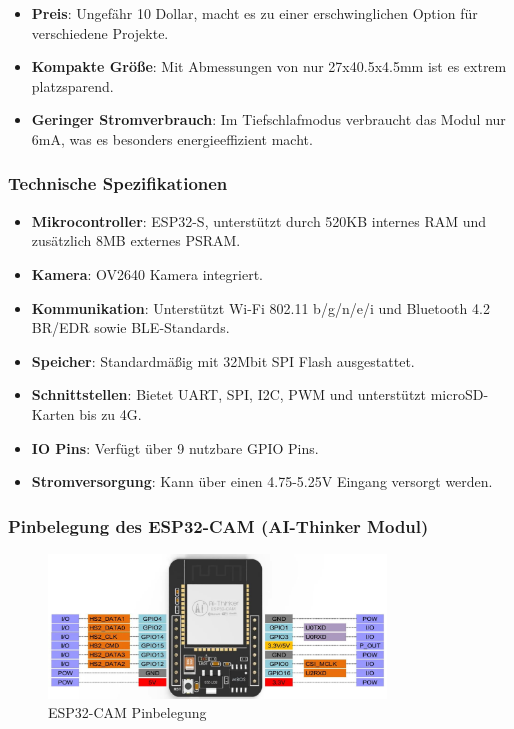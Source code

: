 \documentclass{vorlage-design-main}
\begin{document}
\begin{itemize}

\item
  \textbf{Preis}: Ungefähr 10 Dollar, macht es zu einer erschwinglichen
  Option für verschiedene Projekte.
\item
  \textbf{Kompakte Größe}: Mit Abmessungen von nur 27x40.5x4.5mm ist es
  extrem platzsparend.
\item
  \textbf{Geringer Stromverbrauch}: Im Tiefschlafmodus verbraucht das
  Modul nur 6mA, was es besonders energieeffizient macht.
\end{itemize}

\hypertarget{technische-spezifikationen}{%
\subsubsection{Technische
Spezifikationen}\label{technische-spezifikationen}}

\begin{itemize}

\item
  \textbf{Mikrocontroller}: ESP32-S, unterstützt durch 520KB internes
  RAM und zusätzlich 8MB externes PSRAM.
\item
  \textbf{Kamera}: OV2640 Kamera integriert.
\item
  \textbf{Kommunikation}: Unterstützt Wi-Fi 802.11 b/g/n/e/i und
  Bluetooth 4.2 BR/EDR sowie BLE-Standards.
\item
  \textbf{Speicher}: Standardmäßig mit 32Mbit SPI Flash ausgestattet.
\item
  \textbf{Schnittstellen}: Bietet UART, SPI, I2C, PWM und unterstützt
  microSD-Karten bis zu 4G.
\item
  \textbf{IO Pins}: Verfügt über 9 nutzbare GPIO Pins.
\item
  \textbf{Stromversorgung}: Kann über einen 4.75-5.25V Eingang versorgt
  werden.
\end{itemize}

\hypertarget{pinbelegung-des-esp32-cam-ai-thinker-modul}{%
\subsubsection{Pinbelegung des ESP32-CAM (AI-Thinker
Modul)}\label{pinbelegung-des-esp32-cam-ai-thinker-modul}}

\begin{figure}
\centering
\includegraphics[width=0.8\textwidth]{images/esp32_cam_pinout.pdf}
\floatnotes{}
\caption{ESP32-CAM Pinbelegung}
\end{figure}
\end{document}
